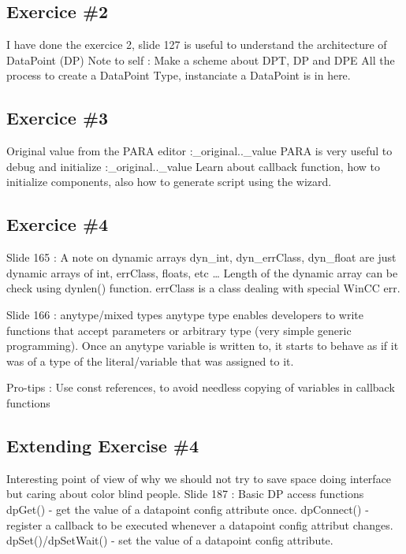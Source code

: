 \documentclass[a4paper, 10pt]{article}
\begin{document}
\subsection{Exercice \#2}
I have done the exercice 2, slide 127 is useful to understand the architecture of DataPoint (DP)
Note to self : Make a scheme about DPT, DP and DPE
All the process to create a DataPoint Type, instanciate a DataPoint is in here.

\subsection{Exercice \#3}
Original value from the PARA editor :\_original..\_value
PARA is very useful to debug and initialize :\_original..\_value
Learn about callback function, how to initialize components, also how to generate script using the wizard.

\subsection{Exercice \#4}

Slide 165 : A note on dynamic arrays
dyn\_int, dyn\_errClass, dyn\_float are just dynamic arrays of int, errClass, floats, etc \dots 
Length of the dynamic array can be check using dynlen() function.
errClass is a class dealing with special WinCC err.

Slide 166 : anytype/mixed types
anytype type enables developers to write functions that accept parameters or arbitrary type (very simple generic programming). Once an anytype variable is written to, it starts to behave as if it was of a type of the literal/variable that was assigned to it.

Pro-tips : Use const references, to avoid needless copying of variables in callback functions

\subsection{Extending Exercise \#4}

Interesting point of view of why we should not try to save space doing interface but caring about color blind people.
Slide 187 : Basic DP access functions
dpGet() - get the value of a datapoint config attribute once.
dpConnect() - register a callback to be executed whenever a datapoint config attribut changes.
dpSet()/dpSetWait() - set the value of a datapoint config attribute.\\
\end{document}
